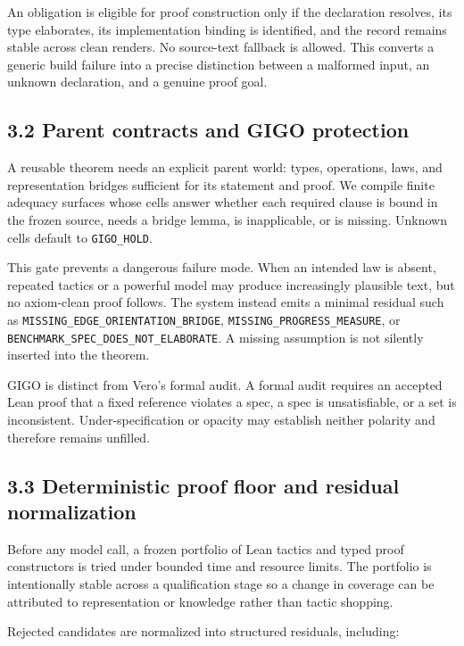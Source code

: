 \documentclass[
  10pt,
]{article}
\begin{document}
An obligation is eligible for proof construction only if the declaration
resolves, its type elaborates, its implementation binding is identified,
and the record remains stable across clean renders. No source-text
fallback is allowed. This converts a generic build failure into a
precise distinction between a malformed input, an unknown declaration,
and a genuine proof goal.

\subsection{3.2 Parent contracts and GIGO
protection}\label{parent-contracts-and-gigo-protection}

A reusable theorem needs an explicit parent world: types, operations,
laws, and representation bridges sufficient for its statement and proof.
We compile finite adequacy surfaces whose cells answer whether each
required clause is bound in the frozen source, needs a bridge lemma, is
inapplicable, or is missing. Unknown cells default to
\texttt{GIGO\_HOLD}.

This gate prevents a dangerous failure mode. When an intended law is
absent, repeated tactics or a powerful model may produce increasingly
plausible text, but no axiom-clean proof follows. The system instead
emits a minimal residual such as
\texttt{MISSING\_EDGE\_ORIENTATION\_BRIDGE},
\texttt{MISSING\_PROGRESS\_MEASURE}, or
\texttt{BENCHMARK\_SPEC\_DOES\_NOT\_ELABORATE}. A missing assumption is
not silently inserted into the theorem.

GIGO is distinct from Vero's formal audit. A formal audit requires an
accepted Lean proof that a fixed reference violates a spec, a spec is
unsatisfiable, or a set is inconsistent. Under-specification or opacity
may establish neither polarity and therefore remains unfilled.

\subsection{3.3 Deterministic proof floor and residual
normalization}\label{deterministic-proof-floor-and-residual-normalization}

Before any model call, a frozen portfolio of Lean tactics and typed
proof constructors is tried under bounded time and resource limits. The
portfolio is intentionally stable across a qualification stage so a
change in coverage can be attributed to representation or knowledge
rather than tactic shopping.

Rejected candidates are normalized into structured residuals, including:
\end{document}
